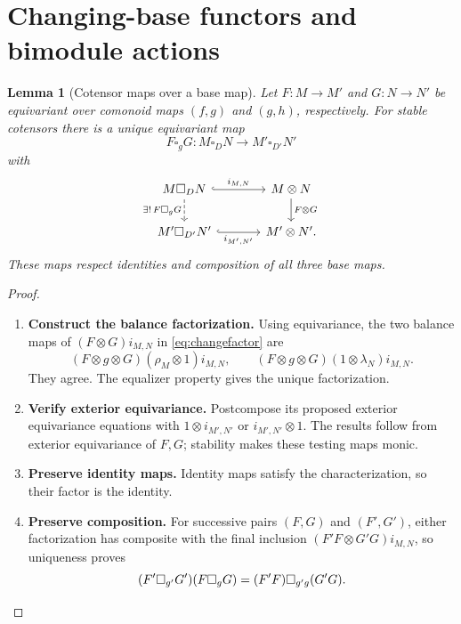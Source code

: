 \documentclass[11pt,reqno]{amsart}
\theoremstyle{plain}
\newtheorem{lemma}[theorem]{Lemma}
\theoremstyle{definition}
\theoremstyle{remark}
\numberwithin{equation}{section}
\begin{document}
\section{Changing-base functors and bimodule actions}\label{sec:changing}

\begin{lemma}[Cotensor maps over a base map]\label{lem:changebase}
Let $F:M\to M'$ and $G:N\to N'$ be equivariant over comonoid maps
$(f,g)$ and $(g,h)$, respectively. For stable cotensors there is a
unique equivariant map
\[
 F\square_g G:M\square_D N\longrightarrow M'\square_{D'}N'
\]
with
\begin{equation}\label{eq:changefactor}
\begin{tikzcd}[column sep=3.5em]
M\square_D N \arrow[r,hook,"i_{M,N}"]
  \arrow[d,dashed,"\exists!\,F\square_g G"'] &
M\otimes N \arrow[d,"F\otimes G"]\\
M'\square_{D'}N' \arrow[r,hook,"i_{M',N'}"'] & M'\otimes N'.
\end{tikzcd}
\end{equation}
These maps respect identities and composition of all three base maps.
\end{lemma}
\begin{proof}\leavevmode
\begin{enumerate}
\item \textbf{Construct the balance factorization.} Using equivariance, the two balance maps of
$(F\otimes G)i_{M,N}$ in \cref{eq:changefactor} are
\[
 (F\otimes g\otimes G)(\rho_M\otimes1)i_{M,N},\qquad
 (F\otimes g\otimes G)(1\otimes\lambda_N)i_{M,N}.
\]
They agree. The equalizer property gives the unique factorization.

\item \textbf{Verify exterior equivariance.} Postcompose its proposed exterior equivariance equations with
$1\otimes i_{M',N'}$ or $i_{M',N'}\otimes1$. The results follow
from exterior equivariance of $F,G$; stability makes these testing maps
monic.

\item \textbf{Preserve identity maps.} Identity maps satisfy the characterization, so their factor is
the identity.

\item \textbf{Preserve composition.} For successive pairs $(F,G)$ and $(F',G')$, either
factorization has composite with the final inclusion
$(F'F\otimes G'G)i_{M,N}$, so uniqueness proves
\[
 (F'\square_{g'}G')(F\square_g G)
       =(F'F)\square_{g'g}(G'G).\qedhere
\]
\end{enumerate}
\end{proof}
\end{document}
